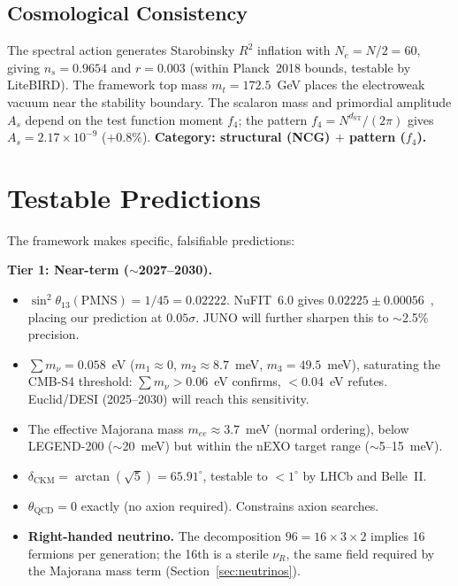 \documentclass[12pt,a4paper]{article}
\theoremstyle{definition}
\begin{document}
\subsection{Cosmological Consistency}
\label{sec:cosmo}

The spectral action generates Starobinsky $R^2$ inflation with $N_e = N/2 = 60$, giving $n_s = 0.9654$ and $r = 0.003$ (within Planck~2018 bounds, testable by LiteBIRD).  The framework top mass $m_t = 172.5$~GeV places the electroweak vacuum near the stability boundary.  The scalaron mass and primordial amplitude $A_s$ depend on the test function moment $f_4$; the pattern $f_4 = N^{d_{\text{ST}}}/(2\pi)$ gives $A_s = 2.17 \times 10^{-9}$ ($+0.8\%$).  \textbf{Category: structural (NCG) $+$ pattern ($f_4$).}


\section{Testable Predictions}
\label{sec:predictions}

The framework makes specific, falsifiable predictions:

\textbf{Tier 1: Near-term ($\sim$2027--2030).}
\begin{itemize}
\item $\sin^2\theta_{13}(\text{PMNS}) = 1/45 = 0.02222$. NuFIT~6.0 gives $0.02225 \pm 0.00056$~\cite{nufit6}, placing our prediction at $0.05\sigma$. JUNO will further sharpen this to $\sim$2.5\% precision.
\item $\sum m_\nu = 0.058$~eV ($m_1 \approx 0$, $m_2 \approx 8.7$~meV, $m_3 = 49.5$~meV), saturating the CMB-S4 threshold: $\sum m_\nu > 0.06$~eV confirms, $< 0.04$~eV refutes.  Euclid/DESI (2025--2030) will reach this sensitivity.
\item The effective Majorana mass $m_{ee} \approx 3.7$~meV (normal ordering), below LEGEND-200 ($\sim$20~meV) but within the nEXO target range ($\sim$5--15~meV).
\item $\delta_{\text{CKM}} = \arctan(\sqrt{5}) = 65.91^\circ$, testable to $< 1^\circ$ by LHCb and Belle~II.
\item $\theta_{\text{QCD}} = 0$ exactly (no axion required). Constrains axion searches.
\item \textbf{Right-handed neutrino.} The decomposition $96 = 16 \times 3 \times 2$ implies 16 fermions per generation; the 16th is a sterile $\nu_R$, the same field required by the Majorana mass term (Section~\ref{sec:neutrinos}).
\end{itemize}
\end{document}
